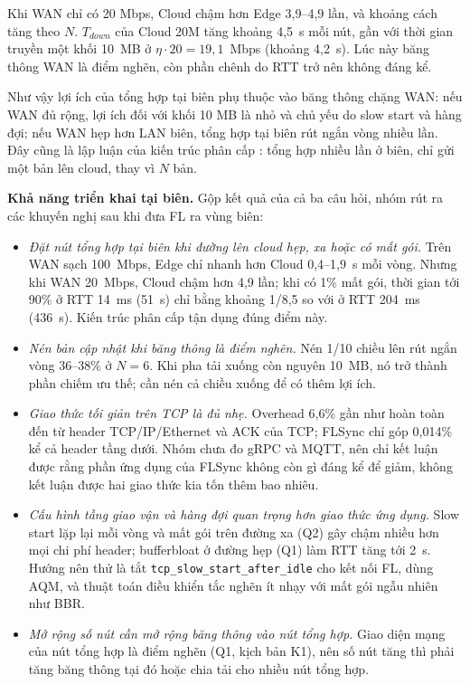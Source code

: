 Khi WAN chỉ có 20 Mbps, Cloud chậm hơn Edge 3{,}9--4{,}9 lần, và khoảng cách tăng theo $N$. $T_{down}$ của Cloud 20M tăng khoảng 4{,}5~s mỗi nút, gần với thời gian truyền một khối 10~MB ở $\eta \cdot 20 = 19{,}1$~Mbps (khoảng 4{,}2~s). Lúc này băng thông WAN là điểm nghẽn, còn phần chênh do RTT trở nên không đáng kể.

Như vậy lợi ích của tổng hợp tại biên phụ thuộc vào băng thông chặng WAN: nếu WAN đủ rộng, lợi ích đối với khối 10 MB là nhỏ và chủ yếu do slow start và hàng đợi; nếu WAN hẹp hơn LAN biên, tổng hợp tại biên rút ngắn vòng nhiều lần. Đây cũng là lập luận của kiến trúc phân cấp \cite{liu2020hierfavg}: tổng hợp nhiều lần ở biên, chỉ gửi một bản lên cloud, thay vì $N$ bản.

\textbf{Khả năng triển khai tại biên.} Gộp kết quả của cả ba câu hỏi, nhóm rút ra các khuyến nghị sau khi đưa FL ra vùng biên:
\begin{itemize}
    \item \emph{Đặt nút tổng hợp tại biên khi đường lên cloud hẹp, xa hoặc có mất gói.} Trên WAN sạch 100~Mbps, Edge chỉ nhanh hơn Cloud 0{,}4--1{,}9~s mỗi vòng. Nhưng khi WAN 20~Mbps, Cloud chậm hơn 4{,}9 lần; khi có 1\% mất gói, thời gian tới 90\% ở RTT 14~ms (51~s) chỉ bằng khoảng 1/8,5 so với ở RTT 204~ms (436~s). Kiến trúc phân cấp \cite{liu2020hierfavg} tận dụng đúng điểm này.
    \item \emph{Nén bản cập nhật khi băng thông là điểm nghẽn.} Nén 1/10 chiều lên rút ngắn vòng 36--38\% ở $N = 6$. Khi pha tải xuống còn nguyên 10~MB, nó trở thành phần chiếm ưu thế; cần nén cả chiều xuống để có thêm lợi ích.
    \item \emph{Giao thức tối giản trên TCP là đủ nhẹ.} Overhead 6{,}6\% gần như hoàn toàn đến từ header TCP/IP/Ethernet và ACK của TCP; FLSync chỉ góp 0{,}014\% kể cả header tầng dưới. Nhóm chưa đo gRPC và MQTT, nên chỉ kết luận được rằng phần ứng dụng của FLSync không còn gì đáng kể để giảm, không kết luận được hai giao thức kia tốn thêm bao nhiêu.
    \item \emph{Cấu hình tầng giao vận và hàng đợi quan trọng hơn giao thức ứng dụng.} Slow start lặp lại mỗi vòng và mất gói trên đường xa (Q2) gây chậm nhiều hơn mọi chi phí header; bufferbloat ở đường hẹp (Q1) làm RTT tăng tới 2~s. Hướng nên thử là tắt \nolinkurl{tcp_slow_start_after_idle} cho kết nối FL, dùng AQM, và thuật toán điều khiển tắc nghẽn ít nhạy với mất gói ngẫu nhiên như BBR.
    \item \emph{Mở rộng số nút cần mở rộng băng thông vào nút tổng hợp.} Giao diện mạng của nút tổng hợp là điểm nghẽn (Q1, kịch bản K1), nên số nút tăng thì phải tăng băng thông tại đó hoặc chia tải cho nhiều nút tổng hợp.
\end{itemize}

